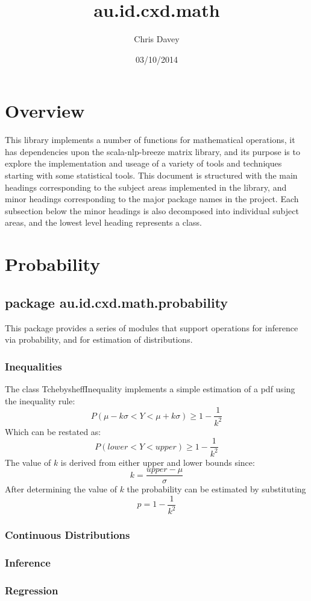 \documentclass[a4paper]{article}
\title{au.id.cxd.math}
\date{03/10/2014}
\author{Chris Davey}
\begin{document}
\section{Overview}

This library implements a number of functions for mathematical operations, it has dependencies upon the scala-nlp-breeze matrix library, and its purpose is to explore the implementation and useage of a variety of tools and techniques starting with some statistical tools.
This document is structured with the main headings corresponding to the subject areas implemented in the library, and minor headings corresponding to the major package names in the project. Each subsection below the minor headings is also decomposed into individual subject areas, and the lowest level heading represents a class.




\section{Probability}

\subsection{package au.id.cxd.math.probability}

This package provides a series of modules that support operations for inference via probability, and for estimation of distributions.

\subsubsection{Inequalities}

The class TchebysheffInequality implements a simple estimation of a pdf using the inequality rule:\\
$$
P(\mu - k\sigma < Y < \mu + k\sigma) \ge 1 - \frac{1}{k^2}
$$
Which can be restated as:
$$
P(lower < Y < upper) \ge 1 - \frac{1}{k^2}
$$
The value of $k$ is derived from either upper and lower bounds since:
$$
k = \frac{upper - \mu} {\sigma}
$$
After determining the value of $k$ the probability can be estimated by substituting
$$
p = 1 - \frac{1}{k^2}
$$





\subsubsection{Continuous Distributions}

\subsubsection{Inference}

\subsubsection{Regression}
\end{document}
